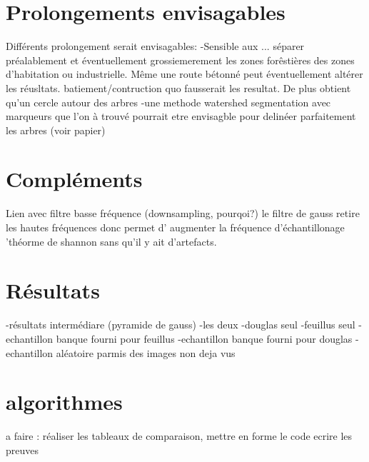 \documentclass{article}
\begin{document}
\section{Prolongements envisagables}

	Différents prolongement serait envisagables: 
	-Sensible aux ... séparer préalablement et éventuellement grossiemerement les zones forêstières des zones d'habitation ou  industrielle. Même une route bétonné peut éventuellement altérer les réusltats. batiement/contruction quo fausserait les resultat. 
	De plus obtient qu'un cercle autour des arbres
	-une methode watershed segmentation avec marqueurs que l'on à trouvé pourrait etre envisagble pour delinéer parfaitement les arbres (voir papier) 

\nocite{NatesanResNet} %



\begin{appendix}

	\section{Compléments}
		Lien avec filtre basse fréquence (downsampling, pourqoi?)
		le filtre de gauss retire les hautes fréquences donc permet d' augmenter la fréquence d'échantillonage 'théorme de shannon sans qu'il y ait d'artefacts. 
	
	\section{Résultats}	
		-résultats intermédiare (pyramide de gauss)
		-les deux 
		-douglas seul 
		-feuillus seul
		-echantillon banque fourni pour feuillus
		-echantillon banque fourni pour douglas 
		-echantillon aléatoire parmis des images non deja vus
	
	\section{algorithmes}
\end{appendix}


a faire : réaliser les tableaux de comparaison, mettre en forme le code 
ecrire les preuves 
\end{document}
